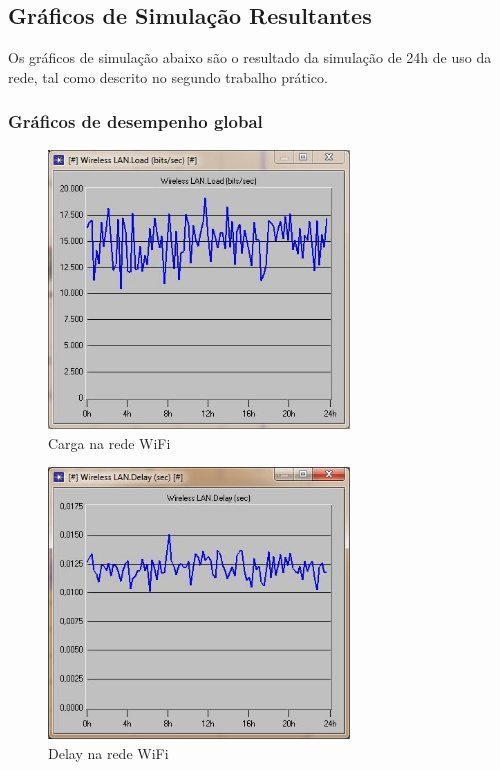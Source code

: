 \documentclass[brazil,times,12pt]{abnt}
\begin{document}
\subsection*{Gráficos de Simulação Resultantes}
Os gráficos de simulação abaixo são o resultado da simulação de 24h de uso da
rede, tal como descrito no segundo trabalho prático.

\subsubsection*{Gráficos de desempenho global}

\begin{figure}[htp]
\begin{center}
  \includegraphics[width=80mm]{SimulacaoRede/CargaWifi.jpg}
  \caption[carga-wifi]{Carga na rede WiFi}
  \label{carga-wifi}
\end{center}
\end{figure}

\begin{figure}[htp]
\begin{center}
  \includegraphics[width=80mm]{SimulacaoRede/DelayWifi.jpg}
  \caption[delay-wifi]{Delay na rede WiFi}
  \label{delay-wifi}
\end{center}
\end{figure}
\end{document}
